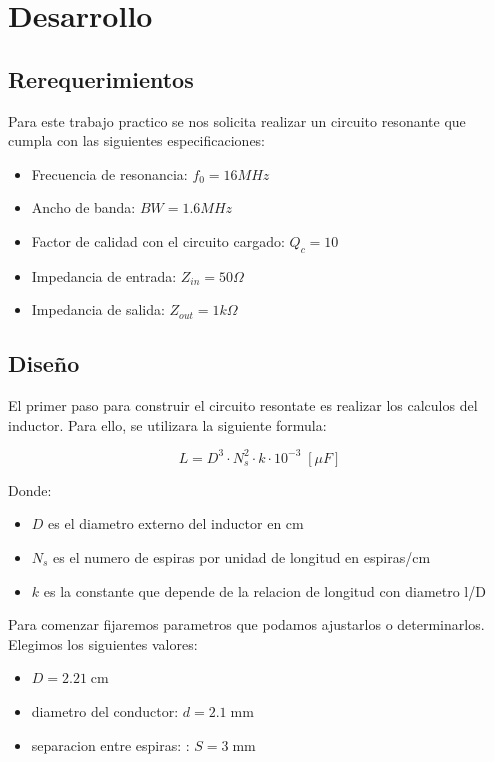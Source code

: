 \section{Desarrollo}

\subsection{Rerequerimientos}

Para este trabajo practico se nos solicita realizar un circuito resonante que cumpla con las siguientes especificaciones:

\begin{itemize}
    \item Frecuencia de resonancia: $f_0 = 16 MHz$
    \item Ancho de banda: $BW = 1.6 MHz$
    \item Factor de calidad con el circuito cargado: $Q_c = 10$
    \item Impedancia de entrada: $Z_{in} = 50 \Omega$
    \item Impedancia de salida: $Z_{out} = 1 k\Omega$
\end{itemize}

\subsection{Diseño}

El primer paso para construir el circuito resontate es realizar los calculos del inductor. Para ello, se utilizara la siguiente formula:

\begin{equation}
    L = D^3 \cdot N_s^2 \cdot k \cdot 10^{-3}\; [\mu F]
\end{equation}

Donde:

\begin{itemize}
    \item $D$ es el diametro externo del inductor en cm 
    \item $N_s$ es el numero de espiras por unidad de longitud en espiras/cm
    \item $k$ es la constante que depende de la relacion de longitud con diametro l/D
\end{itemize}

Para comenzar fijaremos parametros que podamos ajustarlos o determinarlos. Elegimos los siguientes valores:

\begin{itemize}
    \item $D =  2.21\; \text{cm}$
    \item diametro del conductor: $d = 2.1\; \text{mm}$
    \item separacion entre espiras: : $S = 3\; \text{mm}$
\end{itemize}

